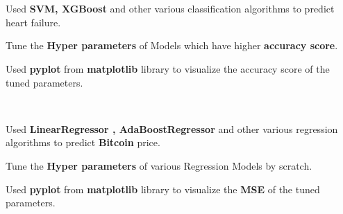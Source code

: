 \documentclass[a4paper]{MagicalCV}
\begin{document}
\begin{minipage}[t]{0.66\textwidth}
 \\
\\ 
\vspace{\topsep} %
\begin{tightemize}
\begin{small}
\item Used {\bf SVM, XGBoost } and other various classification algorithms to predict heart failure.
\item Tune the {\bf Hyper parameters} of Models which have higher {\bf  accuracy score}.
\item Used {\bf pyplot} from {\bf matplotlib} library to visualize the accuracy score of the tuned parameters.
\end{small}
\end{tightemize}
\sectionsep

 \\
\vspace{\topsep} %
\begin{tightemize}
\begin{small}
\item Used {\bf LinearRegressor , AdaBoostRegressor} and other various regression algorithms to predict {\bf  Bitcoin } price.
\item Tune the {\bf Hyper parameters} of various Regression Models by scratch.
\item  Used {\bf pyplot} from {\bf matplotlib} library to visualize the {\bf  MSE} of the tuned parameters.
\end{small}
\end{tightemize}
\sectionsep



\end{minipage}
\end{document}
